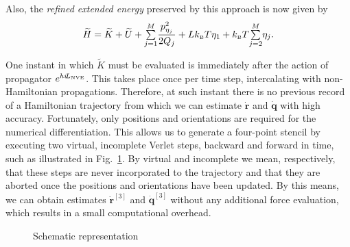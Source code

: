 \documentclass[
journal=jctcce,
layout=twocolumn
]{achemso}
\newcommand{\vt}[1]{\boldsymbol{\mathbf{#1}}}   %
\newcommand{\Liu}[1]{i\!L_\text{#1}}            %
\newcommand{\timestep}{h}
\newcommand{\refined}[1]{\widetilde{#1}}
\begin{document}
Also, the \textit{refined extended energy} preserved by this approach is now given by
\begin{equation}
\label{eq:this extended energy}
{\refined H} = \refined K + \refined U + {\textstyle\sum\limits_{j=1}^{M}} \frac{p_{\eta_j}^2}{2Q_j} + L k_\text{\tiny B} T\eta_1 + k_\text{\tiny B} T {\textstyle\sum\limits_{j=2}^{M}} \eta_j.
\end{equation}

One instant in which $\refined K$ must be evaluated is immediately after the action of propagator $e^{\timestep \Liu{\tiny NVE}}$.
This takes place once per time step, intercalating with non-Hamiltonian propagations.
Therefore, at such instant there is no previous record of a Hamiltonian trajectory from which we can estimate $\dot{\vt r}$ and $\dot{\vt q}$ with high accuracy.
Fortunately, only positions and orientations are required for the numerical differentiation.
This allows us to generate a four-point stencil by executing two virtual, incomplete Verlet steps, backward and forward in time, such as illustrated in Fig.~\ref{fig:virtual steps}.
By virtual and incomplete we mean, respectively, that these steps are never incorporated to the trajectory and that they are aborted once the positions and orientations have been updated.
By this means, we can obtain estimates $\dot{\vt r}^{[3]}$ and $\dot{\vt q}^{[3]}$ without any additional force evaluation, which results in a small computational overhead.

\begin{figure}
\caption{Schematic representation}
\label{fig:virtual steps}
\end{figure}
\end{document}
